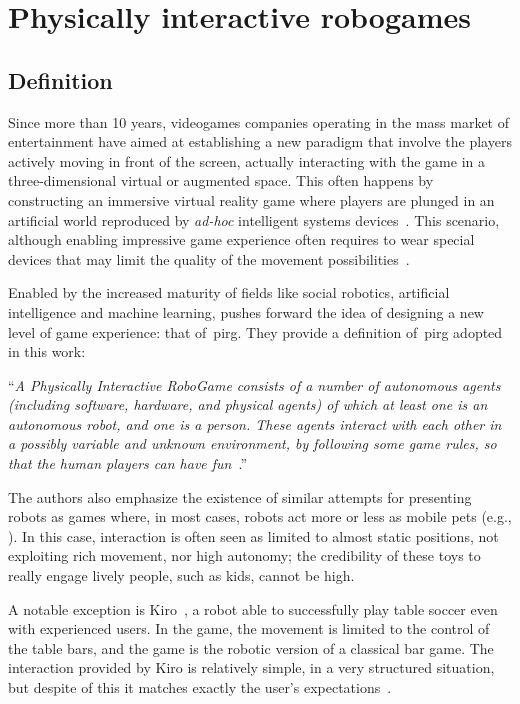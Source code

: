 \chapter{Physically interactive robogames}\label{ch:art}

\section{Definition}
Since more than 10 years, videogames companies operating in the mass market of entertainment have aimed at establishing a new paradigm that involve the players actively moving in front of the screen, actually interacting with the game in a three-dimensional virtual or augmented space. This often happens by constructing an immersive virtual reality game where players are plunged in an artificial world reproduced by \textit{ad-hoc} intelligent systems devices~\citep{zyda_visual_2005}. This scenario, although enabling impressive game experience often requires to wear special devices that may limit the quality of the movement possibilities~\citep{martinoia_physically_2013}.

Enabled by the increased maturity of fields like social robotics, artificial intelligence and machine learning, \cite{martinoia_physically_2013} pushes forward the idea of designing a new level of game experience: that of~\glsdesc{pirg}. They provide a definition of~\gls{pirg} adopted in this work:

``\textit{A Physically Interactive RoboGame consists of a number of autonomous agents (including software, hardware, and physical agents) of which at least one is an autonomous robot, and one is a person. These agents interact with each other in a possibly variable and unknown environment, by following some game rules, so that the human players can have fun}~\citep{martinoia_physically_2013}.''

The authors also emphasize the existence of similar attempts for presenting robots as games where, in most cases, robots act more or less as mobile pets (e.g., \cite{fujita_open_1997,shibata_emotional_1996}). In this case, interaction is often seen as limited to almost static positions, not exploiting rich movement, nor high autonomy; the credibility of these toys to really engage lively people, such as kids, cannot be high.

A notable exception is Kiro~\citep{weigel_kiro-table_2005}, a robot able to successfully play table soccer even with experienced users. In the game, the movement is limited to the control of the table bars, and the game is the robotic version of a classical bar game. The interaction provided by Kiro is relatively simple, in a very structured situation, but despite of this it matches exactly the user's expectations~\citep{martinoia_physically_2013}.

